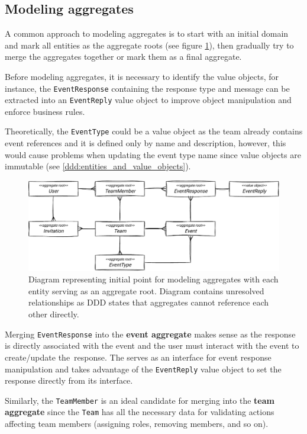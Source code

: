 \subsection{Modeling aggregates}
A common approach to modeling aggregates is to start with an initial domain and mark all entities as the aggregate roots (see figure \ref{fig:domain_aggregates_1}), then gradually try to merge the aggregates together or mark them as a final aggregate. 

Before modeling aggregates, it is necessary to identify the value objects, for instance, the \texttt{EventResponse} containing the response type and message can be extracted into an \texttt{EventReply} value object to improve object manipulation and enforce business rules. 

Theoretically, the \texttt{EventType} could be a value object as the team already contains event references and it is defined only by name and description, however, this would cause problems when updating the event type name since value objects are immutable (see \ref{ddd:entities_and_value_objects}). 
 
\begin{figure} [H]
    \centering
    \includegraphics[width=\textwidth]{figures/domain-aggregates-1.pdf}
    \caption{Diagram representing initial point for modeling aggregates with each entity serving as an aggregate root. Diagram contains unresolved relationships as DDD states that aggregates cannot reference each other directly.}
    \label{fig:domain_aggregates_1}
\end{figure}

Merging \texttt{EventResponse} into the \textbf{event aggregate} makes sense as the response is directly associated with the event and the user must interact with the event to create/update the~response. The  serves as an interface for event response manipulation and takes advantage of the \texttt{EventReply} value object to set the response directly from its interface.

Similarly, the \texttt{TeamMember} is an ideal candidate for merging into the \textbf{team aggregate} since the \texttt{Team} has all the necessary data for validating actions affecting team members (assigning roles, removing members, and so on).

